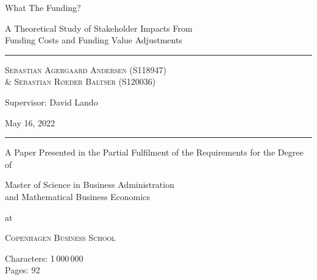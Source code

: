 \documentclass[main.tex]{subfiles}
\begin{document}
	\begin{titlepage}
		\centering
		\vspace{5cm}
		{\fontsize{48pt}{1pt}\selectfont What The Funding? \par}
		\vspace{0.5cm}
		{\Large A Theoretical Study of Stakeholder Impacts From \\ 
				Funding Costs and Funding Value Adjustments \par}
		\rule{\textwidth}{1px}\par
		{\scshape\large 
			Sebastian Agergaard Andersen {\scriptsize(S118947)} \\ %
			\& Sebastian Røeder Baltser {\scriptsize(S120036)} %
		\par}
		Supervisor: David Lando \\
		

		\scalebox{0.95}{%
			\begin{tikzpicture}[remember picture,overlay,shift={([yshift=0.5cm]current page.center)}]
				
			\end{tikzpicture}        
		}
		\vfill
		
		{\Large May 16, 2022 \par}		
		\rule{\textwidth}{1px}\par
		{A Paper Presented in the Partial Fulfilment
		 of the Requirements for the Degree of \\}
		{\Large Master of Science in Business Administration \\
				and Mathematical Business Economics \par}
		at \par 
		{\scshape\LARGE Copenhagen Business School\par}
		\vspace{0.5cm}
		Characters: 1\,000\,000 \\
		Pages: 92
		
		\thispagestyle{empty}
	\end{titlepage}
	\restoregeometry
\end{document}
